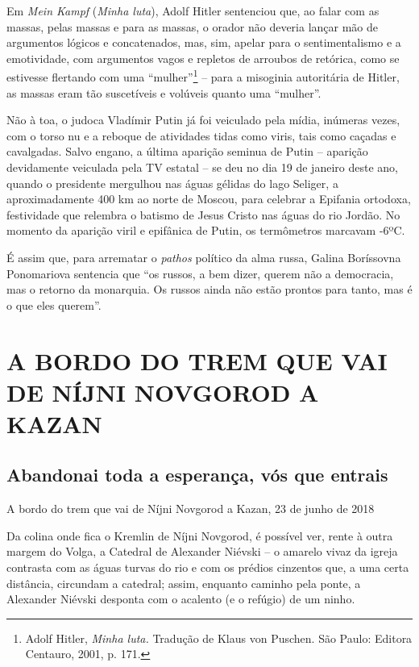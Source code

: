 Em \emph{Mein Kampf} (\emph{Minha luta}), Adolf Hitler sentenciou que,
ao falar com as massas, pelas massas e para as massas, o orador não
deveria lançar mão de argumentos lógicos e concatenados, mas, sim,
apelar para o sentimentalismo e a emotividade, com argumentos vagos e
repletos de arroubos de retórica, como se estivesse flertando com uma
``mulher''\footnote{Adolf Hitler, \emph{Minha luta.} Tradução de Klaus
  von Puschen. São Paulo: Editora Centauro, 2001, p. 171.} -- para a
misoginia autoritária de Hitler, as massas eram tão suscetíveis e
volúveis quanto uma ``mulher''.

Não à toa, o judoca Vladímir Putin já foi veiculado pela mídia, inúmeras
vezes, com o torso nu e a reboque de atividades tidas como viris, tais
como caçadas e cavalgadas. Salvo engano, a última aparição seminua de
Putin -- aparição devidamente veiculada pela TV estatal -- se deu no dia
19 de janeiro deste ano, quando o presidente mergulhou nas águas gélidas
do lago Seliger, a aproximadamente 400 km ao norte de Moscou, para
celebrar a Epifania ortodoxa, festividade que relembra o batismo de
Jesus Cristo nas águas do rio Jordão. No momento da aparição viril e
epifânica de Putin, os termômetros marcavam -6ºC.

É assim que, para arrematar o \emph{pathos} político da alma russa,
Galina Boríssovna Ponomariova sentencia que ``os russos, a bem dizer,
querem não a democracia, mas o retorno da monarquia. Os russos ainda não
estão prontos para tanto, mas é o que eles querem''.

\newpage
{}
\part*{A BORDO DO TREM QUE VAI DE NÍJNI NOVGOROD A KAZAN}

\chapter*{Abandonai toda a esperança, vós que entrais}

\begin{flushright}
A bordo do trem que vai de Níjni Novgorod a Kazan, 23 de junho de 2018
\end{flushright}

Da colina onde fica o Kremlin de Níjni Novgorod, é possível ver, rente à
outra margem do Volga, a Catedral de Alexander Niévski -- o amarelo
vivaz da igreja contrasta com as águas turvas do rio e com os prédios
cinzentos que, a uma certa distância, circundam a catedral; assim,
enquanto caminho pela ponte, a Alexander Niévski desponta com o acalento
(e o refúgio) de um ninho.

